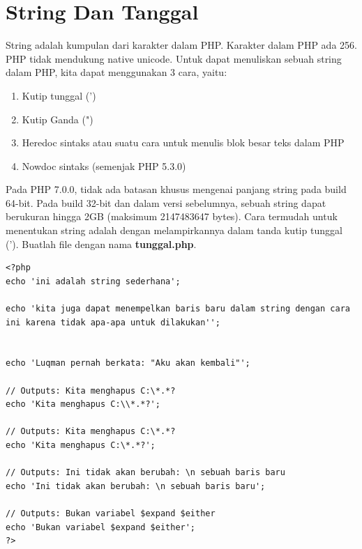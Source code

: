 \section{String Dan Tanggal}
String adalah kumpulan dari karakter dalam PHP. Karakter dalam PHP ada 256. PHP tidak mendukung native unicode. Untuk dapat menuliskan sebuah string dalam PHP, kita dapat menggunakan 3 cara, yaitu:
\begin{enumerate}
\item Kutip tunggal (')
\item Kutip Ganda (")
\item Heredoc sintaks atau suatu cara untuk menulis blok besar teks dalam PHP
\item Nowdoc sintaks (semenjak PHP 5.3.0)
\end{enumerate}
Pada PHP 7.0.0, tidak ada batasan khusus mengenai panjang string pada build 64-bit. Pada build 32-bit dan dalam versi sebelumnya, sebuah string dapat berukuran hingga 2GB (maksimum 2147483647 bytes). Cara termudah untuk menentukan string adalah dengan melampirkannya dalam tanda kutip tunggal ('). Buatlah file dengan nama \textbf{tunggal.php}.
\begin{lstlisting}
<?php
echo 'ini adalah string sederhana';

echo 'kita juga dapat menempelkan baris baru dalam string dengan cara ini karena tidak apa-apa untuk dilakukan'';


echo 'Luqman pernah berkata: "Aku akan kembali"';

// Outputs: Kita menghapus C:\*.*?
echo 'Kita menghapus C:\\*.*?';

// Outputs: Kita menghapus C:\*.*?
echo 'Kita menghapus C:\*.*?';

// Outputs: Ini tidak akan berubah: \n sebuah baris baru
echo 'Ini tidak akan berubah: \n sebuah baris baru';

// Outputs: Bukan variabel $expand $either
echo 'Bukan variabel $expand $either';
?>
\end{lstlisting}

